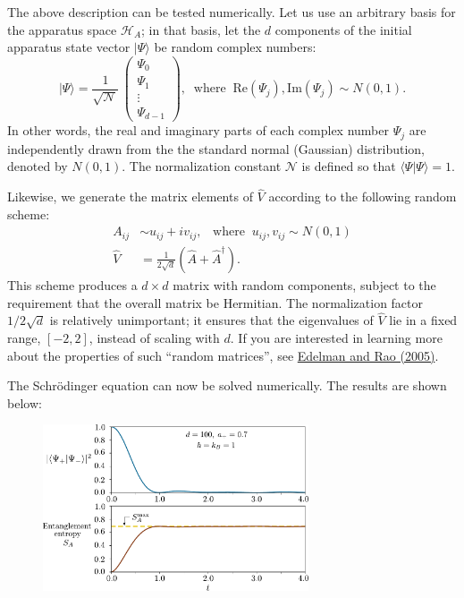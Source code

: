 \documentclass[pra,12pt]{revtex4}
\begin{document}
The above description can be tested numerically.  Let us use an
arbitrary basis for the apparatus space $\mathscr{H}_A$; in that
basis, let the $d$ components of the initial apparatus state vector
$|\Psi\rangle$ be random complex numbers:
\begin{equation}
  |\Psi\rangle = \frac{1}{\sqrt{\mathcal{N}}}\, \begin{pmatrix}\Psi_0 \\ \Psi_1 \\ \vdots \\ \Psi_{d-1}
  \end{pmatrix}, \;\; \mathrm{where} \;\; \mathrm{Re}(\Psi_j), \mathrm{Im}(\Psi_j) \sim N(0,1).
\end{equation}
In other words, the real and imaginary parts of each complex number
$\Psi_j$ are independently drawn from the the standard normal
(Gaussian) distribution, denoted by $N(0,1)$.  The normalization
constant $\mathcal{N}$ is defined so that $\langle\Psi|\Psi\rangle =
1$.

Likewise, we generate the matrix elements of $\hat{V}$ according to
the following random scheme:
$$\begin{aligned}A_{ij} &\sim u_{ij} + i v_{ij}, \;\;\;\mathrm{where}\;\;u_{ij},v_{ij}\sim N(0,1)\\ \hat{V} &= \frac{1}{2\sqrt{d}} \left(\hat{A} + \hat{A}^\dagger\right).\end{aligned}$$
This scheme produces a $d\times d$ matrix with random components,
subject to the requirement that the overall matrix be Hermitian.  The
normalization factor $1/2\sqrt{d}$ is relatively unimportant; it
ensures that the eigenvalues of $\hat{V}$ lie in a fixed range,
$[-2,2]$, instead of scaling with $d$.  If you are interested in
learning more about the properties of such ``random matrices'', see
\hyperref[cite:edelman]{Edelman and Rao (2005)}.

The Schr\"odinger equation can now be solved numerically.  The results
are shown below:

\begin{figure}[h]
  \centering\includegraphics[width=0.7\textwidth]{decoherence}
\end{figure}
\end{document}
